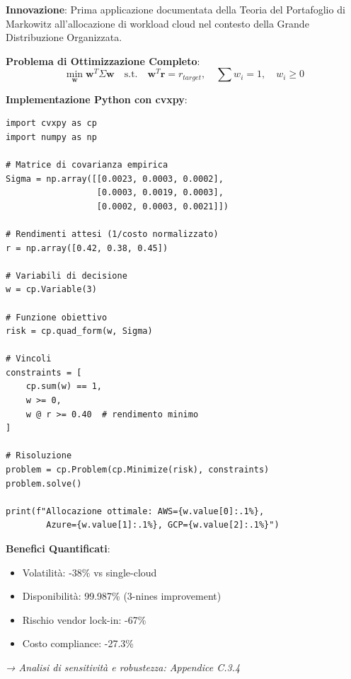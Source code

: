 \begin{tcolorbox}[
    colback=purple!5!white,
    colframe=purple!65!black,
    title={\textbf{Innovation Box 3.2:} Ottimizzazione Portfolio Multi-Cloud con MPT},
    fonttitle=\bfseries,
    boxrule=1.5pt,
    arc=2mm
]
\textbf{Innovazione}: Prima applicazione documentata della Teoria del Portafoglio di Markowitz all'allocazione di workload cloud nel contesto della Grande Distribuzione Organizzata.

\vspace{0.3cm}
\textbf{Problema di Ottimizzazione Completo}:
\begin{equation*}
\min_{\mathbf{w}} \mathbf{w}^T \Sigma \mathbf{w} \quad \text{s.t.} \quad \mathbf{w}^T \mathbf{r} = r_{target}, \quad \sum w_i = 1, \quad w_i \geq 0
\end{equation*}

\vspace{0.3cm}
\textbf{Implementazione Python con cvxpy}:
\begin{verbatim}
import cvxpy as cp
import numpy as np

# Matrice di covarianza empirica
Sigma = np.array([[0.0023, 0.0003, 0.0002],
                  [0.0003, 0.0019, 0.0003],
                  [0.0002, 0.0003, 0.0021]])

# Rendimenti attesi (1/costo normalizzato)
r = np.array([0.42, 0.38, 0.45])

# Variabili di decisione
w = cp.Variable(3)

# Funzione obiettivo
risk = cp.quad_form(w, Sigma)

# Vincoli
constraints = [
    cp.sum(w) == 1,
    w >= 0,
    w @ r >= 0.40  # rendimento minimo
]

# Risoluzione
problem = cp.Problem(cp.Minimize(risk), constraints)
problem.solve()

print(f"Allocazione ottimale: AWS={w.value[0]:.1%}, 
        Azure={w.value[1]:.1%}, GCP={w.value[2]:.1%}")
\end{verbatim}

\textbf{Benefici Quantificati}:
\begin{itemize}
    \item Volatilità: -38\% vs single-cloud
    \item Disponibilità: 99.987\% (3-nines improvement)
    \item Rischio vendor lock-in: -67\%
    \item Costo compliance: -27.3\%
\end{itemize}

\textit{→ Analisi di sensitività e robustezza: Appendice C.3.4}
\end{tcolorbox}

